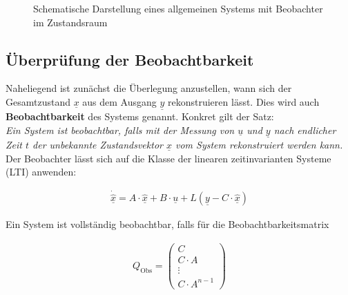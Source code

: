\begin{figure}[H]
    \centering
    \caption[System mit Beobachter]{Schematische Darstellung eines allgemeinen Systems mit Beobachter im Zustandsraum}
    \label{fig:Bild44}
\end{figure}

\subsection{Überprüfung der Beobachtbarkeit}

Naheliegend ist zunächst die Überlegung anzustellen, wann sich der Gesamtzustand $\underline{x}$ aus dem Ausgang $\underline{y}$ rekonstruieren lässt. Dies wird auch \textbf{Beobachtbarkeit} des Systems genannt. Konkret gilt der Satz: \\
\newline
\textit{Ein System ist beobachtbar, falls mit der Messung von $\underline{u}$ und $\underline{y}$ nach endlicher Zeit $t$ der unbekannte Zustandsvektor $\underline{x}$ vom System rekonstruiert werden kann.} \\
\newline
Der Beobachter lässt sich auf die Klasse der linearen zeitinvarianten Systeme (LTI) anwenden:

\begin{align}
    \underline{\dot{\hat{x}}} = A \cdot \underline{\hat{x}} + B \cdot \underline{u} + L \left( \underline{y} - C \cdot \underline{\hat{x}}\right)
\end{align}

Ein System ist vollständig beobachtbar, falls für die Beobachtbarkeitsmatrix

\begin{align}
    Q_{\mathrm{Obs}} =
    \begin{pmatrix}
        C \\
        C \cdot A \\
        \vdots \\
        C \cdot A^{n - 1}
    \end{pmatrix}
\end{align}

